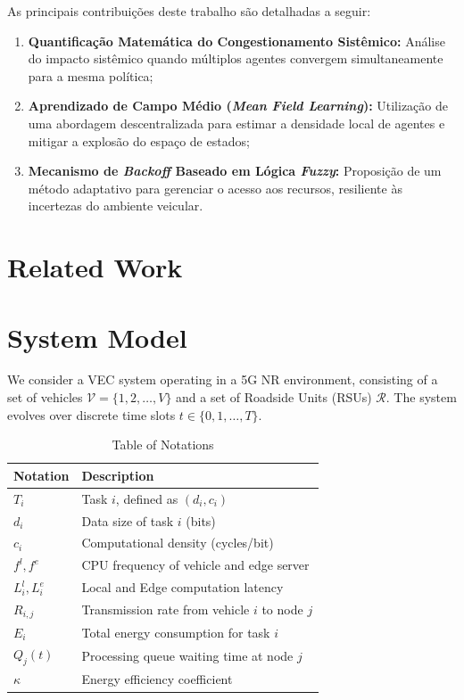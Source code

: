 \documentclass[iicol]{sn-jnl}
\begin{document}
As principais contribuições deste trabalho são detalhadas a seguir:
\begin{enumerate}[label=(\roman*)]
    \item \textbf{Quantificação Matemática do Congestionamento Sistêmico:} Análise do impacto sistêmico quando múltiplos agentes convergem simultaneamente para a mesma política;
    \item \textbf{Aprendizado de Campo Médio (\textit{Mean Field Learning}):} Utilização de uma abordagem descentralizada para estimar a densidade local de agentes e mitigar a explosão do espaço de estados;
    \item \textbf{Mecanismo de \textit{Backoff} Baseado em Lógica \textit{Fuzzy}:} Proposição de um método adaptativo para gerenciar o acesso aos recursos, resiliente às incertezas do ambiente veicular.
\end{enumerate}

\section{Related Work}\label{sec_related_work}

\section{System Model}\label{sec_system_model}

We consider a VEC system operating in a 5G NR environment, consisting of a set of vehicles $\mathcal{V} = \{1, 2, \dots, V\}$ and a set of Roadside Units (RSUs) $\mathcal{R}$. The system evolves over discrete time slots $t \in \{0, 1, \dots, T\}$.

\begin{table}[!ht]
    \caption{Table of Notations}\label{tab_notations}
    \begin{tabular}{ll}
        \toprule
        \bfseries Notation & \bfseries Description\\
        \midrule
        $T_i$ & Task $i$, defined as $(d_i, c_i)$ \\
        $d_i$ & Data size of task $i$ (bits) \\
        $c_i$ & Computational density (cycles/bit) \\
        $f^l, f^e$ & CPU frequency of vehicle and edge server \\
        $L_i^l, L_i^e$ & Local and Edge computation latency \\
        $R_{i,j}$ & Transmission rate from vehicle $i$ to node $j$ \\
        $E_i$ & Total energy consumption for task $i$ \\
        $Q_j(t)$ & Processing queue waiting time at node $j$ \\
        $\kappa$ & Energy efficiency coefficient \\
        \bottomrule
    \end{tabular}
\end{table}
\end{document}
